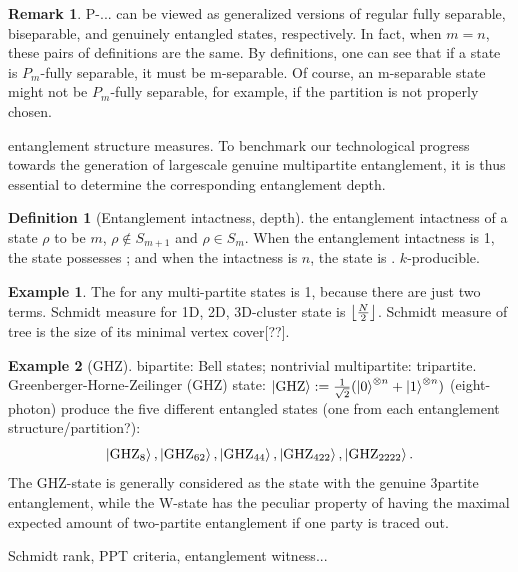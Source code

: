 \documentclass[
10pt,
aps,
pra,
linenumbers,
floatfix,
]{revtex4-2}
\theoremstyle{plain}
\theoremstyle{definition}
\newtheorem{definition}{Definition}
\newtheorem{observation}{Observation}
\newtheorem{example}{Example}
\newtheorem{remark}{Remark}
\newcommand{\ghz}{\text{GHZ}}
\newcommand{\dm}{\rho}
\begin{document}
\begin{remark}
	P-... can be viewed as generalized versions of regular fully separable, biseparable, and genuinely entangled states, respectively.
	In fact, when $m=n$, these pairs of definitions are the same.
	By definitions, one can see that if a state is $P_m$-fully separable, it must be m-separable. Of course, an m-separable state might not be $P_m$-fully separable, for example, if the partition is not properly chosen.
\end{remark}
entanglement structure measures.
To benchmark our technological progress towards the generation of largescale genuine multipartite entanglement, it is thus essential to determine the corresponding entanglement depth.
\begin{definition}[Entanglement intactness, depth]
	the entanglement intactness of a state $\dm$ to be $m$, \iff $\dm\notin S_{m+1}$ and $\dm\in S_m$.
	When the entanglement intactness is 1, the state possesses ; and when the intactness is $n$, the state is .
	$k$-producible.
\end{definition}
\begin{example}
	The  for any multi-partite  states is 1, because there are just two terms.
	Schmidt measure for 1D, 2D, 3D-cluster state is $\left\lfloor \frac{N}{2} \right\rfloor$.
	Schmidt measure of tree is the size of its minimal vertex cover[??].
\end{example}
\begin{example}[GHZ]\label{exm:ghz}
	bipartite: Bell states;
	nontrivial multipartite: tripartite.
	Greenberger-Horne-Zeilinger (GHZ) state: $\ket{\ghz}:=\frac{1}{\sqrt{2}}(\ket{0}^{\otimes n} + \ket{1}^{\otimes n} )$ (eight-photon) produce the five different entangled states (one from each entanglement structure/partition?): 
	\begin{equation*}
		\ket{\ghz_8},\ket{\ghz_{62}},\ket{\ghz_{44}},\ket{\ghz_{422}},\ket{\ghz_{2222}}.
	\end{equation*}
	The GHZ-state is generally considered as the state with the genuine 3partite entanglement, while the W-state has the peculiar property of having the maximal expected amount of two-partite entanglement if one party is traced out.

	Schmidt rank, PPT criteria, entanglement witness...
\end{example}
\end{document}
